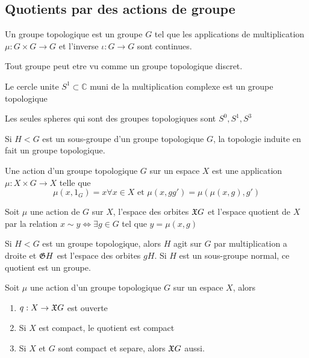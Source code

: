 \documentclass[../main.tex]{subfiles}
\begin{document}
\subsection{Quotients par des actions de groupe}
\begin{defn}
	Un groupe topologique est un groupe $G$ tel que les applications de multiplication $\mu: G\times G \to G$ et l'inverse $\iota: G\to G$ sont continues.
\end{defn}
Tout groupe peut etre vu comme un groupe topologique discret.
\begin{exemple}
Le cercle unite $S^{1} \subset  \mathbb{C}$ muni de la multiplication complexe est un groupe topologique
\end{exemple}
\begin{rmq}
Les seules spheres qui sont des groupes topologiques sont $S^0, S^1, S^3 $ 
\end{rmq}
\begin{lemma}
Si $H <G$ est un sous-groupe d'un groupe topologique $G$, la topologie induite en fait un groupe topologique.
\end{lemma}
\begin{defn}
	Une action d'un groupe topologique $G$ sur un espace $X$ est une application $\mu: X\times G \to X$ telle que 
	\[ 
	\mu( x,1_G) = x\forall x \in X \text{ et } \mu( x,gg') =\mu(  \mu( x,g), g'  ) 
	\]

	
\end{defn}
\begin{defn}
	Soit $\mu$ une action de $G$ sur $X$, l'espace des orbites $ \frak X G$ et l'espace quotient de $X$ par la relation $x\sim y\iff \exists g\in G $ tel que $y= \mu( x,g) $ 	
\end{defn}
\begin{rmq}
Si $H < G$ est un groupe topologique, alors $H$ agit sur $G$ par multiplication a droite et $ \frak G H$ est l'espace des orbites $gH$. Si $H$ est un sous-groupe normal, ce quotient est un groupe.
\end{rmq}
\begin{propo}
Soit $\mu$ une action d'un groupe topologique $G$ sur un espace $X$, alors
\begin{enumerate}
\item $q: X\to \frak X G$ est ouverte
\item Si $X$ est compact, le quotient est compact
\item Si $X$ et $G$ sont compact et separe, alors $ \frak X G$ aussi.
\end{enumerate}
\end{propo}
\end{document}
